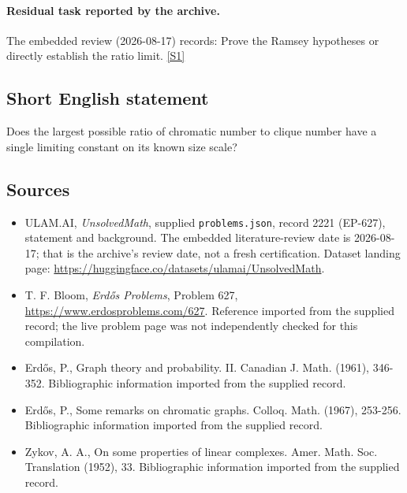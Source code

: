 \documentclass[11pt,a4paper]{article}
\newcommand{\sref}[2]{\hyperlink{source:#1:#2}{[S#2]}}
\begin{document}
\paragraph{Residual task reported by the archive.}

The embedded review (2026-08-17) records: Prove the Ramsey hypotheses or directly establish the ratio limit. \sref{2221}{1}

\subsection{Short English statement}

Does the largest possible ratio of chromatic number to clique number have a single limiting constant on its known size scale?

\subsection{Sources}

{\small

\begin{itemize}

\item[\hypertarget{source:2221:1}{S1}] ULAM.AI, \emph{UnsolvedMath}, supplied \texttt{problems.json}, record 2221 (EP-627), statement and background. The embedded literature-review date is 2026-08-17; that is the archive’s review date, not a fresh certification. Dataset landing page: \url{https://huggingface.co/datasets/ulamai/UnsolvedMath}.

\item[\hypertarget{source:2221:2}{S2}] T. F. Bloom, \emph{Erdős Problems}, Problem 627, \url{https://www.erdosproblems.com/627}. Reference imported from the supplied record; the live problem page was not independently checked for this compilation.

\item[\hypertarget{source:2221:3}{S3}] Erd\H{o}s, P., Graph theory and probability. II. Canadian J. Math. (1961), 346-352. Bibliographic information imported from the supplied record.

\item[\hypertarget{source:2221:4}{S4}] Erd\H{o}s, P., Some remarks on chromatic graphs. Colloq. Math. (1967), 253-256. Bibliographic information imported from the supplied record.

\item[\hypertarget{source:2221:5}{S5}] Zykov, A. A., On some properties of linear complexes. Amer. Math. Soc. Translation (1952), 33. Bibliographic information imported from the supplied record.

\end{itemize}

}

\label{end:2221}
\end{document}
